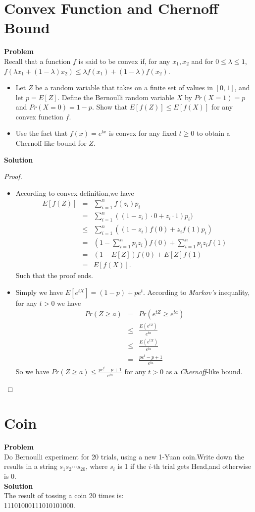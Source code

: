 \section{Convex Function and Chernoff Bound}
\textbf{Problem}\\
Recall that a function $f$ is said to be convex if, for any $x_1, x_2$ and for $0 \le \lambda \le 1$, $f(\lambda x_1 + (1-\lambda) x_2) \le \lambda f(x_1)+ (1-\lambda) f(x_2)$.
\begin{itemize}
	\item Let $Z$ be a random variable that takes on a finite set of values in $[0, 1]$, and let $p = E[Z]$. Define the Bernoulli random variable $X$ by $Pr(X = 1) = p$ and $Pr(X = 0) = 1-p$. Show that $E[f(Z)] \le E[f(X)]$ for any convex function $f$.
	\item Use the fact that $f(x) = e^{tx}$ is convex for any fixed $t \ge 0$ to obtain a Chernoff-like bound for $Z$.\\
\end{itemize}
\textbf{Solution}\\
\begin{proof}
	\begin{itemize}
\item According to convex definition,we have
\begin{eqnarray*}
	E[f(Z)]
	&=& \sum_{i=1}^{n}f(z_i)p_i\\
	&=& \sum_{i=1}^{n}((1-z_i)\cdot 0+z_i\cdot 1)p_i)\\
	&\leq & \sum_{i=1}^{n} \left((1-z_i)f(0)+z_i f(1)p_i \right)\\
	&=& \left(1-\sum_{i=1}^{n}p_iz_i \right)f(0)+\sum_{i=1}^{n}p_iz_if(1)\\
	&=& (1-E[Z])f(0)+E[Z]f(1)\\
	&=& E[f(X)].
\end{eqnarray*}
Such that the proof ends.
\item Simply we have $E[e^{tX}] = (1-p) + pe^t$.
 According to \textit{Markov's} inequality, for any $t>0$ we have
 \begin{eqnarray*}
 Pr(Z \ge a) 
 &=& Pr(e^{tZ}\ge e^{ta})\\
 &\le& \frac{E(e^{tZ})}{e^{ta}} \\
 &\le & \frac{E(e^{tX})}{e^{ta}}\\
 &=& \frac{pe^t-p+1}{e^{ta}}
 \end{eqnarray*}
 So we have $Pr(Z \ge a) \le \frac{pe^t-p+1}{e^{ta}}$ for any $t>0$ as a \textit{Chernoff}-like bound.
\end{itemize}
\end{proof}

\section{Coin}
\textbf{Problem}\\
Do Bernoulli experiment for 20 trials, using a new 1-Yuan coin.Write down the results in a string $s_1 s_2 \cdots s_{20}$, where $s_i$ is 1 if the $i$-th trial gets Head,and otherwise is 0.
\\
\textbf{Solution}\\
The result of tossing a coin 20 times is:\\11101000111010101000.

